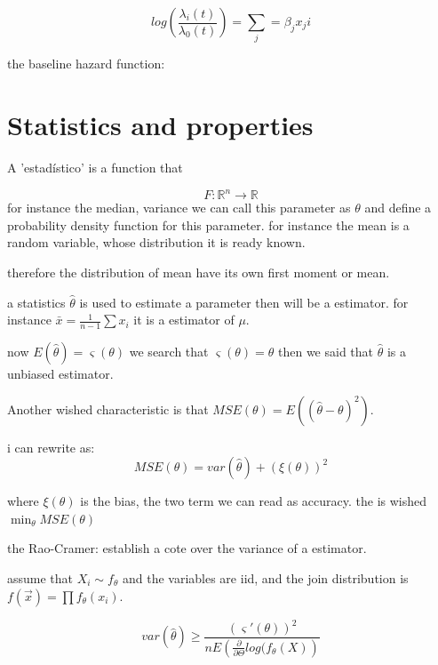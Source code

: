 \documentclass[10pt,a4paper]{article}
\begin{document}
\begin{equation}
    log \left( \frac{\lambda_{i}(t)}{\lambda_{0}(t)} \right) = \sum_{j} = \beta_{j}x_{j}{i}
\end{equation}




the baseline hazard function:




\section{Statistics and properties}

A 'estadístico' is a function that 

$$ F: \mathbb{R}^{n} \rightarrow  \mathbb{R}$$
for instance the median, variance we can call this parameter as $\theta$ and 
define a probability density function for this parameter.
for instance the mean is a random variable, whose distribution it is ready known.

therefore the distribution of mean have its own first moment or mean.



a statistics $\hat{\theta}$ is used to estimate a parameter then will be a estimator. for instance $\bar{x} = \frac{1}{n-1}\sum x_{i}$ it is a estimator of $\mu$.

now $E(\hat{\theta}) = \varsigma(\theta)$
we search that $\varsigma(\theta) = \theta$
then we said that $\hat{\theta}$ is a unbiased estimator.

Another wished characteristic is that $MSE(\theta) = E((\hat{\theta}-\theta)^{2}).$

i can rewrite as:
\begin{equation}
MSE(\theta) = var(\hat{\theta}) + (\xi(\theta))^{2}
\end{equation}

where $\xi(\theta)$ is the bias, the two term  we can read as accuracy.
the is wished $\min_{\theta} MSE(\theta)$

the Rao-Cramer:
establish a cote over the variance of a estimator.

assume that $X_{i} \sim f_{\theta}$ and the variables are iid, and the join distribution is $f(\vec{x}) = \prod f_{\theta}(x_{i}).$



\begin{equation}
var(\hat{\theta}) \geq \frac{(\varsigma'(\theta))^{2}}{nE \left(                             \frac{\partial}{\partial \Theta} log(f_{\theta}(X)   \right)     }
\end{equation}
\end{document}
